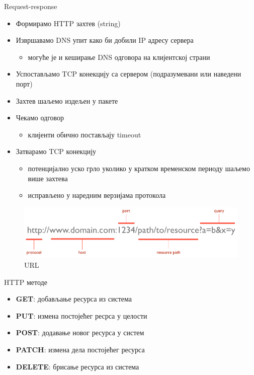 \documentclass{beamer}
\begin{document}
\begin{frame}[allowframebreaks]{Request-response}
        \begin{itemize}
            \item Формирамо HTTP захтев (string)
            \item Извршавамо DNS упит како би добили IP адресу сервера
            \begin{itemize}
                \item могуће је и кеширање DNS одговора на клијентској страни
            \end{itemize}
            \item Успостављамо TCP конекцију са сервером (подразумевани или наведени порт)
            \item Захтев шаљемо издељен у пакете
            \item Чекамо одговор
            \begin{itemize}
                \item клијенти обично постављају timeout
            \end{itemize}
            \item Затварамо TCP конекцију
            \begin{itemize}
                \item потенцијално уско грло уколико у кратком временском периоду шаљемо више захтева
                \item исправљено у наредним верзијама протокола
            \end{itemize}
        \end{itemize}
        
        \framebreak
        
        \begin{figure}
            \centering
            \includegraphics[width=\textwidth,height=\textheight,keepaspectratio]{images/url.png}
            \caption{URL}
            \label{fig:url}
        \end{figure}
    \end{frame}
    
    \begin{frame}{HTTP методе}
        \begin{itemize}
            \item \textbf{GET}: добављање ресурса из система
            \item \textbf{PUT}: измена постојећег ресрса у целости
            \item \textbf{POST}: додавање новог ресурса у систем
            \item \textbf{PATCH}: измена дела постојећег ресурса
            \item \textbf{DELETE}: брисање ресурса из система
        \end{itemize}
    \end{frame}
    
\end{document}

